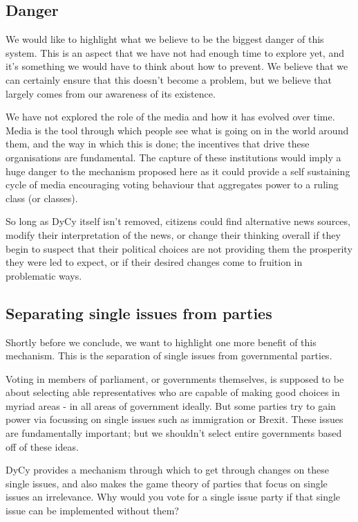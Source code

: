 \documentclass[twoside]{article}
\begin{document}
\subsection{Danger}

We would like to highlight what we believe to be the biggest danger of this system. This is an aspect that we have not had enough time to explore yet, and it’s something we would have to think about how to prevent. We believe that we can certainly ensure that this doesn’t become a problem, but we believe that largely comes from our awareness of its existence.

We have not explored the role of the media and how it has evolved over time. Media is the tool through which people see what is going on in the world around them, and the way in which this is done; the incentives that drive these organisations are fundamental. The capture of these institutions would imply a huge danger to the mechanism proposed here as it could provide a self sustaining cycle of media encouraging voting behaviour that aggregates power to a ruling class (or classes).

So long as DyCy itself isn’t removed, citizens could find alternative news sources, modify their interpretation of the news, or change their thinking overall if they begin to suspect that their political choices are not providing them the prosperity they were led to expect, or if their desired changes come to fruition in problematic ways.

\subsection{Separating single issues from parties}

Shortly before we conclude, we want to highlight one more benefit of this mechanism. This is the separation of single issues from governmental parties.

Voting in members of parliament, or governments themselves, is supposed to be about selecting able representatives who are capable of making good choices in myriad areas - in all areas of government ideally. But some parties try to gain power via focussing on single issues such as immigration or Brexit. These issues are fundamentally important; but we shouldn’t select entire governments based off of these ideas.

DyCy provides a mechanism through which to get through changes on these single issues, and also makes the game theory of parties that focus on single issues an irrelevance. Why would you vote for a single issue party if that single issue can be implemented without them?
\end{document}
